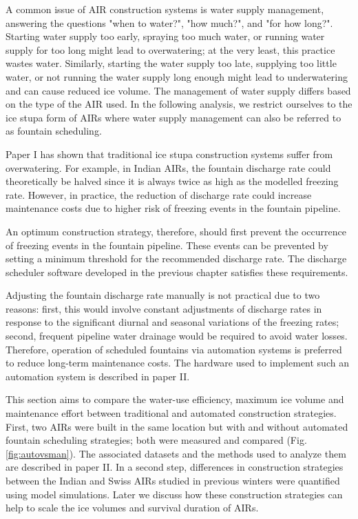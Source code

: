 A common issue of AIR construction systems is water supply management, answering the questions "when to
water?", "how much?", and "for how long?". Starting water supply too early, spraying too much water, or
running water supply for too long might lead to overwatering; at the very least, this practice wastes water.
Similarly, starting the water supply too late, supplying too little water, or not running the water supply long
enough might lead to underwatering and can cause reduced ice volume. The management of water supply
differs based on the type of the AIR used. In the following analysis, we restrict ourselves to the ice stupa
form of AIRs where water supply management can also be referred to as fountain scheduling.

Paper I has shown that traditional ice stupa construction systems suffer from overwatering. For example, in
Indian AIRs, the fountain discharge rate could theoretically be halved since it is always twice as high as the
modelled freezing rate. However, in practice, the reduction of discharge rate could increase maintenance costs
due to higher risk of freezing events in the fountain pipeline.

An optimum construction strategy, therefore, should first prevent the occurrence of freezing events in the
fountain pipeline. These events can be prevented by setting a minimum threshold for the recommended discharge
rate. The discharge scheduler software developed in the previous chapter satisfies these requirements.

Adjusting the fountain discharge rate manually is not practical due to two reasons: first, this would involve
constant adjustments of discharge rates in response to the significant diurnal and seasonal variations of the
freezing rates; second, frequent pipeline water drainage would be required to avoid water losses. Therefore, operation
of scheduled fountains via automation systems is preferred to reduce long-term maintenance costs. The
hardware used to implement such an automation system is described in paper II.

This section aims to compare the water-use efficiency, maximum ice volume and maintenance effort between
traditional and automated construction strategies. First, two AIRs were built in the same location but with and
without automated fountain scheduling strategies; both were measured and compared (Fig. \ref{fig:autovsman}).
The associated datasets and the methods used to analyze them are described in paper II. In a second step,
differences in construction strategies between the Indian and Swiss AIRs studied in previous winters were quantified
using model simulations. Later we discuss how these construction strategies can help to scale the ice volumes and
survival duration of AIRs.

